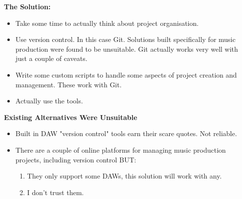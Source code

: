 \documentclass[unknownkeysallowed,usepdftitle=false, parskip=full]{beamer}
\newcommand{\secvariable}{nothing}
\newcommand{\mysection}[1]{\renewcommand{\secvariable}{#1}
}
\begin{document}
\begin{frame}\label{\secvariable}
\parbox{\linewidth}{
\textbf{The Solution:}
\begin{itemize}
    \item Take some time to actually think about project organisation.
    \item Use version control. In this case Git. Solutions built specifically for music production were found to be unsuitable. Git actually works very well with just a couple of caveats.
    \item Write some custom scripts to handle some aspects of project creation and management. These work with Git.
    \item Actually use the tools.
\end{itemize}
}
\end{frame}

\mysection{alternatives}
\begin{frame}\label{\secvariable}
\parbox{\linewidth}{
\textbf{Existing Alternatives Were Unsuitable}
\vspace{12pt}
\begin{itemize}
    \item Built in DAW "version control" tools earn their scare quotes. Not reliable.
    \vspace{12pt}
    \item There are a couple of online platforms for managing music production projects, including version control BUT:
    \begin{enumerate}
        \item They only support some DAWs, this solution will work with any.
        \item I don't trust them.
    \end{enumerate}
\end{itemize}
}
\end{frame}
\end{document}
